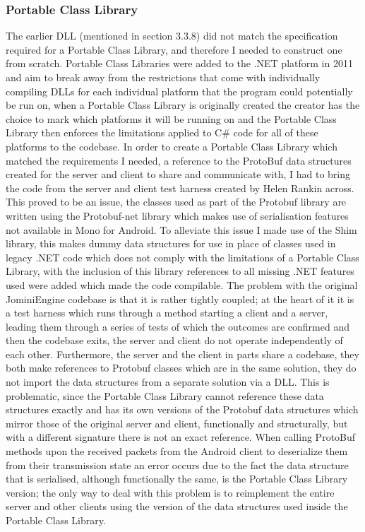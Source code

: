 \documentclass{article}
\begin{document}
\subsubsection{Portable Class Library}
The earlier DLL (mentioned in section 3.3.8) did not match the specification required for a Portable Class Library, and therefore I needed to construct one from scratch. Portable Class Libraries were added to the .NET platform in 2011 and aim to break away from the restrictions that come with individually compiling DLLs for each individual platform that the program could potentially be run on, when a Portable Class Library is originally created the creator has the choice to mark which platforms it will be running on and the Portable Class Library then enforces the limitations applied to C\# code for all of these platforms to the codebase. In order to create a Portable Class Library which matched the requirements I needed, a reference to the ProtoBuf data structures created for the server and client to share and communicate with, I had to bring the code from the server and client test harness created by Helen Rankin across. This proved to be an issue, the classes used as part of the Protobuf library are written using the Protobuf-net library which makes use of serialisation features not available in Mono for Android. To alleviate this issue I made use of the Shim library, this makes dummy data structures for use in place of classes used in legacy .NET code which does not comply with the limitations of a Portable Class Library, with the inclusion of this library references to all missing .NET features used were added which made the code compilable. The problem with the original JominiEngine codebase is that it is rather tightly coupled; at the heart of it it is a test harness which runs through a method starting a client and a server, leading them through a series of tests of which the outcomes are confirmed and then the codebase exits, the server and client do not operate independently of each other. Furthermore, the server and the client in parts share a codebase, they both make references to Protobuf classes which are in the same solution, they do not import the data structures from a separate solution via a DLL. This is problematic, since the Portable Class Library cannot reference these data structures exactly and has its own versions of the Protobuf data structures which mirror those of the original server and client, functionally and structurally, but with a different signature there is not an exact reference. When calling ProtoBuf methods upon the received packets from the Android client to deserialize them from their transmission state an error occurs due to the fact the data structure that is serialised, although functionally the same, is the Portable Class Library version; the only way to deal with this problem is to reimplement the entire server and other clients using the version of the data structures used inside the Portable Class Library.
\end{document}

